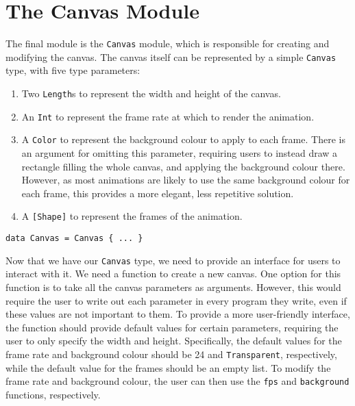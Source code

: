 \documentclass[../main.tex]{subfiles}
\begin{document}
    \section{The Canvas Module}
        The final module is the \verb|Canvas| module, which is responsible for creating
            and modifying the canvas.
        The canvas itself can be represented by a simple \verb|Canvas| type, with five type parameters:
        \begin{enumerate}
            \item Two \verb|Length|s to represent the width and height of the canvas.
            \item An \verb|Int| to represent the frame rate at which to render the animation.
            \item A \verb|Color| to represent the background colour to apply to each frame.
                  There is an argument for omitting this parameter, requiring users to instead
                      draw a rectangle filling the whole canvas, and applying the background colour
                      there.
                  However, as most animations are likely to use the same background colour for
                      each frame, this provides a more elegant, less repetitive solution.
            \item A \verb|[Shape]| to represent the frames of the animation.
        \end{enumerate}

        \begin{lstlisting}[label={lst:canvas}, caption={The Canvas type definition.}]
data Canvas = Canvas { ... }\end{lstlisting}

        Now that we have our \verb|Canvas| type, we need to provide an interface for
            users to interact with it.
        We need a function to create a new canvas.
        One option for this function is to take all the canvas parameters as arguments.
        However, this would require the user to write out each parameter in every
            program they write, even if these values are not important to them.
        To provide a more user-friendly interface, the function should provide default
            values for certain parameters, requiring the user to only specify the width and
            height.
        Specifically, the default values for the frame rate and background colour
            should be 24 and \verb|Transparent|, respectively, while the default value for
            the frames should be an empty list.
        To modify the frame rate and background colour, the user can then use the
            \verb|fps| and \verb|background| functions, respectively.
\end{document}
